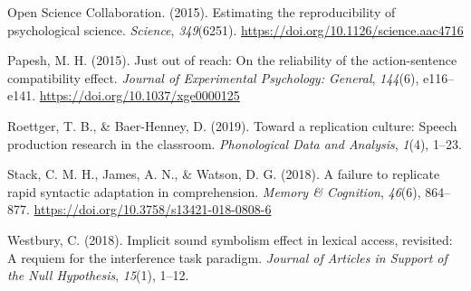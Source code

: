 \documentclass[
  english,
  man]{apa6}
\begin{document}
\leavevmode\hypertarget{ref-open_science_collaboration_estimating_2015}{}%
Open Science Collaboration. (2015). Estimating the reproducibility of psychological science. \emph{Science}, \emph{349}(6251). \url{https://doi.org/10.1126/science.aac4716}

\leavevmode\hypertarget{ref-papesh_just_2015}{}%
Papesh, M. H. (2015). Just out of reach: On the reliability of the action-sentence compatibility effect. \emph{Journal of Experimental Psychology: General}, \emph{144}(6), e116--e141. \url{https://doi.org/10.1037/xge0000125}

\leavevmode\hypertarget{ref-roettger2019toward}{}%
Roettger, T. B., \& Baer-Henney, D. (2019). Toward a replication culture: Speech production research in the classroom. \emph{Phonological Data and Analysis}, \emph{1}(4), 1--23.

\leavevmode\hypertarget{ref-stack_failure_2018}{}%
Stack, C. M. H., James, A. N., \& Watson, D. G. (2018). A failure to replicate rapid syntactic adaptation in comprehension. \emph{Memory \& Cognition}, \emph{46}(6), 864--877. \url{https://doi.org/10.3758/s13421-018-0808-6}

\leavevmode\hypertarget{ref-westbury_implicit_2018}{}%
Westbury, C. (2018). Implicit sound symbolism effect in lexical access, revisited: A requiem for the interference task paradigm. \emph{Journal of Articles in Support of the Null Hypothesis}, \emph{15}(1), 1--12.

\endgroup
\end{document}
